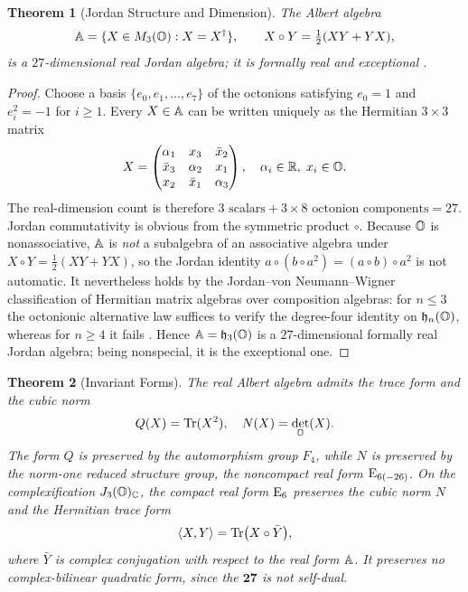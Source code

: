 \documentclass[pdflatex,sn-mathphys-num]{sn-jnl}
\theoremstyle{thmstyleone}
\newtheorem{theorem}{Theorem}
\theoremstyle{thmstylethree}%
\theoremstyle{thmstyletwo}%
\begin{document}
\begin{theorem}[Jordan Structure and Dimension]\label{thm:JordanDim}
The Albert algebra
\[
  \mathbb{A}=\{X\in M_{3}(\mathbb{O}):X=X^{\dagger}\},
  \qquad
  X\circ Y=\tfrac12(XY+YX),
\]
is a $27$-dimensional real Jordan algebra; it is formally real and exceptional
\cite{Jacobson:1968,McCrimmon:2004}.
\end{theorem}

\begin{proof}
Choose a basis $\{e_{0},e_{1},\dots,e_{7}\}$ of the octonions satisfying $e_{0}=1$ and $e_{i}^{2}=-1$ for $i\ge1$.
Every $X\in\mathbb{A}$ can be written uniquely as the Hermitian $3\times3$ matrix
\[
  X=\begin{pmatrix}
        \alpha_{1} & x_{3} & \bar x_{2}\\
        \bar x_{3} & \alpha_{2} & x_{1}\\
        x_{2} & \bar x_{1} & \alpha_{3}
      \end{pmatrix},
  \quad
  \alpha_{i}\in\mathbb R,
  \;
  x_{i}\in\mathbb{O}.
\]
The real-dimension count is therefore
$3\text{ scalars}+3\times8\text{ octonion components}=27$.
Jordan commutativity is obvious from the symmetric product $\circ$.
Because $\mathbb{O}$ is nonassociative, $\mathbb{A}$ is \emph{not} a subalgebra of an
associative algebra under $X\circ Y=\tfrac12(XY+YX)$, so the Jordan identity
$a\circ(b\circ a^{2})=(a\circ b)\circ a^{2}$ is not automatic. It nevertheless
holds by the Jordan--von Neumann--Wigner classification of Hermitian matrix
algebras over composition algebras: for $n\le3$ the octonionic alternative law
suffices to verify the degree-four identity on $\mathfrak h_{n}(\mathbb{O})$, whereas
for $n\ge4$ it fails \cite{Schafer:1966,Jacobson:1968,McCrimmon:2004}. Hence
$\mathbb{A}=\mathfrak h_{3}(\mathbb{O})$ is a $27$-dimensional formally real Jordan
algebra; being nonspecial, it is the exceptional one.
\end{proof}

\begin{theorem}[Invariant Forms]\label{thm:Invs}
The real Albert algebra admits the trace form and the cubic norm
\[
  Q(X)=\operatorname{Tr}(X^{2}),
  \quad
  N(X)=\det_{\mathbb{O}}(X).
\]
The form $Q$ is preserved by the automorphism group $F_4$, while $N$ is
preserved by the norm-one reduced structure group, the noncompact real form
$\mathrm{E}_{6(-26)}$. On the complexification $J_3(\mathbb{O})_{\mathbb C}$, the compact real form
$\mathrm{E}_{6}$ preserves the cubic norm $N$ and the Hermitian trace form
\[
  \langle X,Y\rangle=\operatorname{Tr}\bigl(X\circ \bar Y\bigr),
\]
where $\bar Y$ is complex conjugation with respect to the real form $\mathbb{A}$.
It preserves no complex-bilinear quadratic form, since the $\mathbf{27}$ is
not self-dual.
\end{theorem}
\end{document}
